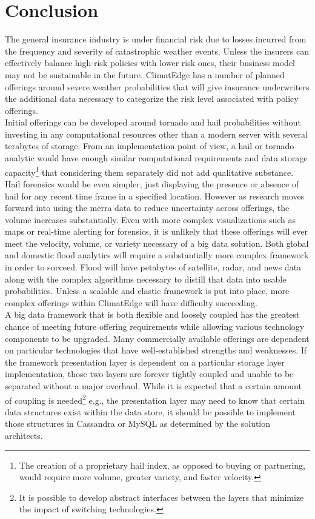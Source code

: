 \section{Conclusion}
The general insurance industry is under financial risk due to losses incurred from the frequency and severity of catastrophic weather events. Unless the insurers can effectively balance high-risk policies with lower risk ones, their business model may not be sustainable in the future. ClimatEdge has a number of planned offerings around severe weather probabilities that will give insurance underwriters the additional data necessary to categorize the risk level associated with policy offerings.\\

Initial offerings can be developed around tornado and hail probabilities without investing in any computational resources other than a modern server with several terabytes of storage. From an implementation point of view, a hail or tornado analytic would have enough similar computational requirements and data storage capacity\footnote{The creation of a proprietary hail index, as opposed to buying or partnering, would require more volume, greater variety, and faster velocity.} that considering them separately did not add qualitative substance. Hail forensics would be even simpler, just displaying the presence or absence of hail for any recent time frame in a specified location. However as research moves forward into using the \gls{merra} data to reduce uncertainty across offerings, the volume increases substantially. Even with more complex visualizations such as maps or real-time alerting for forensics, it is unlikely that these offerings will ever meet the velocity, volume, or variety necessary of a big data solution. Both global and domestic flood analytics will require a substantially more complex framework in order to succeed. Flood will have petabytes of satellite, radar, and news data along with the complex algorithms necessary to distill that data into usable probabilities. Unless a scalable and elastic framework is put into place, more complex offerings within ClimatEdge will have difficulty succeeding.\\

A big data framework that is both flexible and loosely coupled has the greatest chance of meeting future offering requirements while allowing various technology components to be upgraded. Many commercially available offerings are dependent on particular technologies that have well-established strengths and weaknesses. If the framework presentation layer is dependent on a particular storage layer implementation, those two layers are forever tightly coupled and unable to be separated without a major overhaul. While it is expected that a certain amount of coupling is needed\footnote{It is possible to develop abstract interfaces between the layers that minimize the impact of switching technologies.} e.g., the presentation layer may need to know that certain data structures exist within the data store, it should be possible to implement those structures in Cassandra or MySQL as determined by the solution architects.\\


